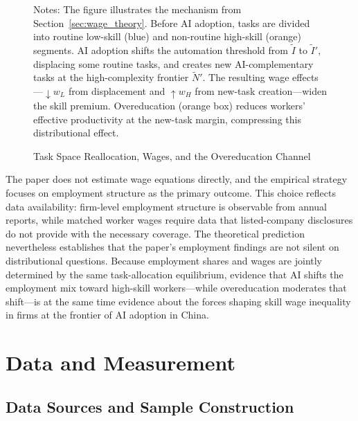 \documentclass[12pt,a4paper]{article}
\theoremstyle{predstyle}
\theoremstyle{plain}
\begin{document}
\begin{figure}[H]
{%
}
\caption{Task Space Reallocation, Wages, and the Overeducation Channel}
\label{fig:taskspace}
\begin{minipage}{0.92\textwidth}
\footnotesize
Notes: The figure illustrates the mechanism from Section~\ref{sec:wage_theory}. Before AI adoption, tasks are divided into routine low-skill (blue) and non-routine high-skill (orange) segments. AI adoption shifts the automation threshold from $\tilde{I}$ to $\tilde{I}'$, displacing some routine tasks, and creates new AI-complementary tasks at the high-complexity frontier $\tilde{N}'$. The resulting wage effects---$\downarrow w_L$ from displacement and $\uparrow w_H$ from new-task creation---widen the skill premium. Overeducation (orange box) reduces workers' effective productivity at the new-task margin, compressing this distributional effect.
\end{minipage}
\end{figure}

The paper does not estimate wage equations directly, and the empirical strategy focuses on employment structure as the primary outcome. This choice reflects data availability: firm-level employment structure is observable from annual reports, while matched worker wages require data that listed-company disclosures do not provide with the necessary coverage. The theoretical prediction nevertheless establishes that the paper's employment findings are not silent on distributional questions. Because employment shares and wages are jointly determined by the same task-allocation equilibrium, evidence that AI shifts the employment mix toward high-skill workers---while overeducation moderates that shift---is at the same time evidence about the forces shaping skill wage inequality in firms at the frontier of AI adoption in China.

\section{Data and Measurement}
\label{sec:data}

\subsection{Data Sources and Sample Construction}
\end{document}
